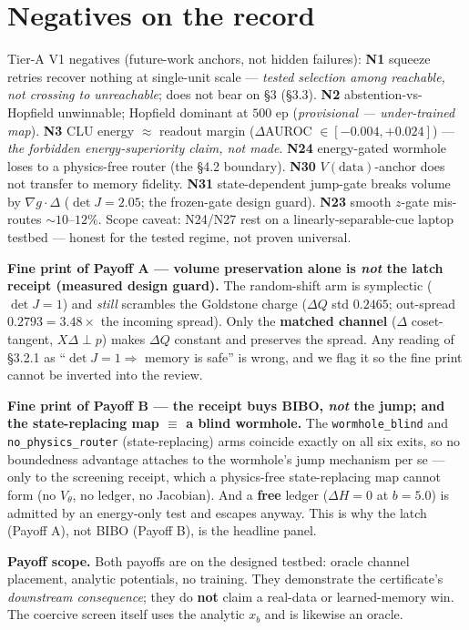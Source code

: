 \documentclass[11pt]{article}
\newcommand{\detJ}{\det J}
\begin{document}
\section{Negatives on the record}
Tier-A V1 negatives (future-work anchors, not hidden failures): \textbf{N1} squeeze retries recover nothing at single-unit scale --- \emph{tested selection among reachable, not crossing to unreachable}; does not bear on \S3 (\S3.3). \textbf{N2} abstention-vs-Hopfield unwinnable; Hopfield dominant at $500$ ep (\emph{provisional --- under-trained map}). \textbf{N3} CLU energy $\approx$ readout margin ($\Delta$AUROC $\in[-0.004,+0.024]$) --- \emph{the forbidden energy-superiority claim, not made}. \textbf{N24} energy-gated wormhole loses to a physics-free router (the \S4.2 boundary). \textbf{N30} $V(\text{data})$-anchor does not transfer to memory fidelity. \textbf{N31} state-dependent jump-gate breaks volume by $\nabla g\cdot\Delta$ ($\detJ=2.05$; the frozen-gate design guard). \textbf{N23} smooth $z$-gate mis-routes $\sim10$--$12\%$. Scope caveat: N24/N27 rest on a linearly-separable-cue laptop testbed --- honest for the tested regime, not proven universal.

\textbf{Fine print of Payoff A --- volume preservation alone is \emph{not} the latch receipt (measured design guard).} The random-shift arm is symplectic ($\detJ=1$) and \emph{still} scrambles the Goldstone charge ($\Delta Q$ std $0.2465$; out-spread $0.2793=3.48\times$ the incoming spread). Only the \textbf{matched channel} ($\Delta$ coset-tangent, $X\Delta\perp p$) makes $\Delta Q$ constant and preserves the spread. Any reading of \S3.2.1 as ``$\detJ=1\Rightarrow$ memory is safe'' is wrong, and we flag it so the fine print cannot be inverted into the review.

\textbf{Fine print of Payoff B --- the receipt buys BIBO, \emph{not} the jump; and the state-replacing map $\equiv$ a blind wormhole.} The \texttt{wormhole\_blind} and \texttt{no\_physics\_router} (state-replacing) arms coincide exactly on all six exits, so no boundedness advantage attaches to the wormhole's jump mechanism per se --- only to the screening receipt, which a physics-free state-replacing map cannot form (no $V_\theta$, no ledger, no Jacobian). And a \textbf{free} ledger ($\Delta H=0$ at $b=5.0$) is admitted by an energy-only test and escapes anyway. This is why the latch (Payoff A), not BIBO (Payoff B), is the headline panel.

\textbf{Payoff scope.} Both payoffs are on the designed testbed: oracle channel placement, analytic potentials, no training. They demonstrate the certificate's \emph{downstream consequence}; they do \textbf{not} claim a real-data or learned-memory win. The coercive screen itself uses the analytic $x_b$ and is likewise an oracle.
\end{document}
